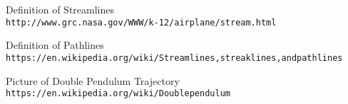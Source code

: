\documentclass[
     11pt,         %
     a4paper,      %
     oneside,
     ]{article}
\begin{document}
\begin{thebibliography}{9}	
	Definition of Streamlines
	\\\texttt{http://www.grc.nasa.gov/WWW/k-12/airplane/stream.html}
	
	Definition of Pathlines
	\\\texttt{https://en.wikipedia.org/wiki/Streamlines,streaklines,andpathlines}
	
	Picture of Double Pendulum Trajectory
	\\\texttt{https://en.wikipedia.org/wiki/Doublependulum}
\end{thebibliography}
\end{document}
